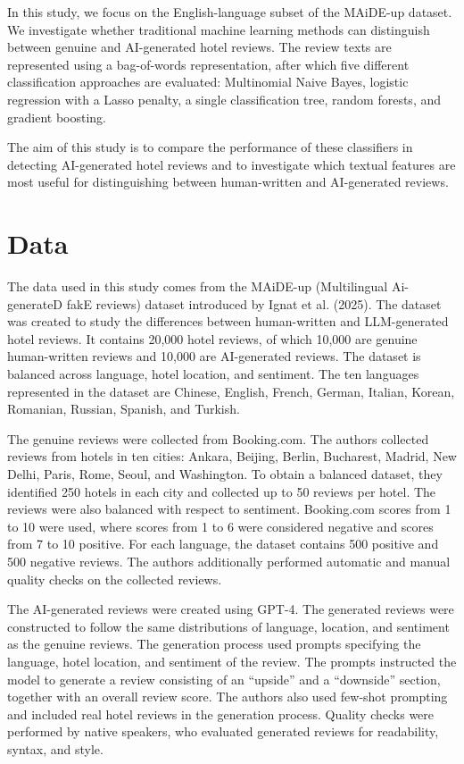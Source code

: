\documentclass{article}
\begin{document}
In this study, we focus on the English-language subset of the MAiDE-up dataset. We investigate whether traditional machine learning methods can distinguish between genuine and AI-generated hotel reviews. The review texts are represented using a bag-of-words representation, after which five different classification approaches are evaluated: Multinomial Naive Bayes, logistic regression with a Lasso penalty, a single classification tree, random forests, and gradient boosting.

The aim of this study is to compare the performance of these classifiers in detecting AI-generated hotel reviews and to investigate which textual features are most useful for distinguishing between human-written and AI-generated reviews.

\section{Data}
The data used in this study comes from the MAiDE-up (Multilingual Ai-generateD fakE reviews) dataset introduced by Ignat et al. (2025). The dataset was created to study the differences between human-written and LLM-generated hotel reviews. It contains 20,000 hotel reviews, of which 10,000 are genuine human-written reviews and 10,000 are AI-generated reviews. The dataset is balanced across language, hotel location, and sentiment. The ten languages represented in the dataset are Chinese, English, French, German, Italian, Korean, Romanian, Russian, Spanish, and Turkish. \cite{ignat-etal-2025-maide}

The genuine reviews were collected from Booking.com. The authors collected reviews from hotels in ten cities: Ankara, Beijing, Berlin, Bucharest, Madrid, New Delhi, Paris, Rome, Seoul, and Washington. To obtain a balanced dataset, they identified 250 hotels in each city and collected up to 50 reviews per hotel. The reviews were also balanced with respect to sentiment. Booking.com scores from 1 to 10 were used, where scores from 1 to 6 were considered negative and scores from 7 to 10 positive. For each language, the dataset contains 500 positive and 500 negative reviews. The authors additionally performed automatic and manual quality checks on the collected reviews. \cite{ignat-etal-2025-maide}

The AI-generated reviews were created using GPT-4. The generated reviews were constructed to follow the same distributions of language, location, and sentiment as the genuine reviews. The generation process used prompts specifying the language, hotel location, and sentiment of the review. The prompts instructed the model to generate a review consisting of an ``upside'' and a ``downside'' section, together with an overall review score. The authors also used few-shot prompting and included real hotel reviews in the generation process. Quality checks were performed by native speakers, who evaluated generated reviews for readability, syntax, and style. \cite{ignat-etal-2025-maide}
\end{document}
